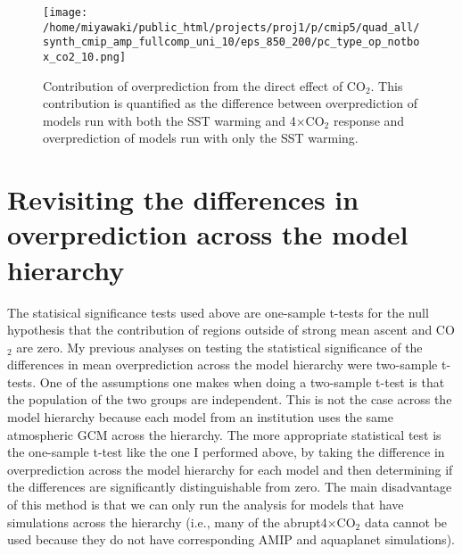 \documentclass{article}
\begin{document}
\begin{figure}
    \centering
    \texttt{[image: /home/miyawaki/public\_html/projects/proj1/p/cmip5/quad\_all/synth\_cmip\_amp\_fullcomp\_uni\_10/eps\_850\_200/pc\_type\_op\_notbox\_co2\_10.png]}
    \caption{Contribution of overprediction from the direct effect of CO$_2$. This contribution is quantified as the difference between overprediction of models run with both the SST warming and 4$\times$CO$_2$ response and overprediction of models run with only the SST warming.}
    \label{fig:contrib-co2}
\end{figure}

\section{Revisiting the differences in overprediction across the model hierarchy}
The statisical significance tests used above are one-sample t-tests for the null hypothesis that the contribution of regions outside of strong mean ascent and CO$_2$ are zero. My previous analyses on testing the statistical significance of the differences in mean overprediction across the model hierarchy were two-sample t-tests. One of the assumptions one makes when doing a two-sample t-test is that the population of the two groups are independent. This is not the case across the model hierarchy because each model from an institution uses the same atmospheric GCM across the hierarchy. The more appropriate statistical test is the one-sample t-test like the one I performed above, by taking the difference in overprediction across the model hierarchy for each model and then determining if the differences are significantly distinguishable from zero. The main disadvantage of this method is that we can only run the analysis for models that have simulations across the hierarchy (i.e., many of the abrupt4$\times$CO$_2$ data cannot be used because they do not have corresponding AMIP and aquaplanet simulations).
\end{document}
